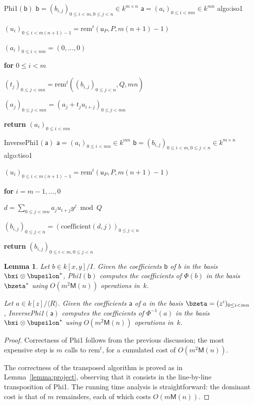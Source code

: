 \documentclass{sig-alternate}
\def\M {\ensuremath{\mathsf{M}}}
\def\va {\ensuremath{\mathsf{a}}}
\def\vu {\ensuremath{\mathsf{u}}}
\def\vb {\ensuremath{\mathsf{b}}}
\def\rem {\ensuremath{\mathrm{rem}}}
\def\coeff {\ensuremath{\mathrm{coefficient}}}
\newcounter{algo}
\newenvironment{algorithm_noendline}[4]{\small\begin{center}\begin{minipage}{0.48\textwidth}
      \refstepcounter{algo}
      \label{#4}
      \sf
      \rule{\textwidth}{0.2pt}\\
      \makebox[\textwidth][c]{Algorithm~\arabic{algo}:~\textbf{#1}}\\
      \rule[0.5\baselineskip]{\textwidth}{0.2pt}\\

      \vspace{-12pt}

      \parbox{\textwidth}{\textbf{Input} #2}
      \parbox{\textwidth}{\textbf{Output} #3}

\vspace{-7pt}

      \begin{enumerate*}}{\end{enumerate*}
      \vspace{-11pt}
\end{minipage}\end{center}
}
\newenvironment{algorithm_endline}[4]{\small\begin{center}\begin{minipage}{0.48\textwidth}
      \refstepcounter{algo}
      \label{#4}
      \sf
      \rule{\textwidth}{0.2pt}\\
      \makebox[\textwidth][c]{Algorithm~\arabic{algo}:~\textbf{#1}}\\
      \rule[0.5\baselineskip]{\textwidth}{0.2pt}\\

      \vspace{-12pt}

      \parbox{\textwidth}{\textbf{Input} #2}
      \parbox{\textwidth}{\textbf{Output} #3}

\vspace{-7pt}

      \begin{enumerate*}}{\end{enumerate*}
      \vspace{-11pt}
      \rule{\textwidth}{0.2pt}
\end{minipage}\end{center}
}
\newcommand{\ang}[1]{\langle#1\rangle}
\newtheorem{Lemma}{Lemma}
\begin{document}
\begin{algofloat}[t]
  \begin{algorithm_noendline}
{Phi1$(\vb)$}
{$\vb = (b_{i,j})_{0 \le i < m, 0 \le j < n} \in k^{m \times n}$}
{$\va = (a_{i})_{0 \le i < mn} \in k^{m n}$}
{algo:iso1}
\item $(u_i)_{0\le i < m(n+1)-1} = \rem^t(\vu_P,P,m(n+1)-1)$
\item  $(a_i)_{0\le i < mn} = (0,\dots,0)$
\item {\bf for} {$0\le i < m$}
\item \hspace{7mm} $(t_j)_{0\le j < mn} = \rem^t( (b_{i,j})_{0 \le j <n},Q,mn)$
\item \hspace{7mm} $(a_j)_{0\le j < mn} = (a_j + t_ju_{i+j})_{0\le j < mn}$
\item {\bf return} $(a_i)_{0\le i <mn}$
  \end{algorithm_noendline}
\begin{algorithm_endline}
{InversePhi1$(\va)$}
{$\va = (a_{i})_{0 \le i < mn} \in k^{m n}$}
{$\vb = (b_{i,j})_{0 \le i < m, 0 \le j < n} \in k^{m \times n}$}
{algo:tiso1}
\item $(u_i)_{0\le i < m(n+1)-1} = \rem^t(\vu_P,P,m(n+1)-1)$
\item {\bf for} {$i = m-1,\dots,0$}
\item \hspace{7mm} $d=\sum_{0 \le j < mn} a_j u_{i+j} y^j \bmod Q$
\item \hspace{7mm}  $(b_{i,j})_{0 \le j < n} = (\coeff(d,j))_{0 \le j < n}$
\item {\bf return} $(b_{i,j})_{0 \le i < m, 0 \le j < n}$
\end{algorithm_endline}
\vspace{-4ex}
\end{algofloat}

\begin{Lemma}
  Let $b \in k[x,y]/I$. Given the coefficients $\vb$ of $b$ in the
  basis $\bxi \otimes \bupsilon^\ast$, {\sf Phi1}$(\vb)$ computes the
  coefficients of $\Phi(b)$ in the basis $\bzeta^\ast$ using
  $O(m^2\M(n))$ operations in~$k$.

   Let $a\in k[z]/\ang{R}$. Given the coefficients $\va$ of $a$ in the
  basis $\bzeta=(z^i)_{0 \le i < mn}$, {\sf InversePhi1}$(\va)$
  computes the coefficients of $\Phi^{-1}(a)$ in the basis $\bxi
  \otimes \bupsilon^\ast$ using $O(m^2\M(n))$ operations in~$k$.
\end{Lemma}
\begin{proof}
  Correctness of {\sf Phi1} follows from the previous discussion; the
  most expensive step is $m$ calls to $\rem^t$, for a cumulated cost
  of $O(m^2\M(n))$.

  The correctness of the transposed algorithm is proved as in
  Lemma~\ref{lemma:project}, observing that it consists in the
  line-by-line transposition of {\sf Phi1}. The running time analysis
  is straightforward: the dominant cost is that of $m$ remainders,
  each of which costs $O(m\M(n))$.
\end{proof}
\end{document}
